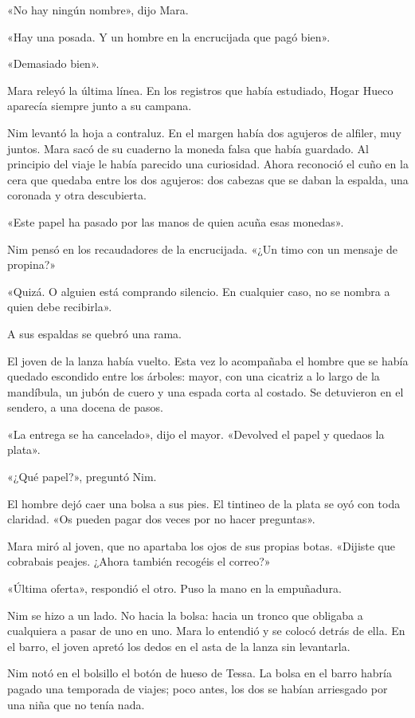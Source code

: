 \documentclass[10pt,a4paper]{article}
\begin{document}
«No hay ningún nombre», dijo Mara.

«Hay una posada. Y un hombre en la encrucijada que pagó bien».

«Demasiado bien».

Mara releyó la última línea. En los registros que había estudiado, Hogar Hueco aparecía siempre junto a su campana.

Nim levantó la hoja a contraluz. En el margen había dos agujeros de alfiler, muy juntos. Mara sacó de su cuaderno la moneda falsa que había guardado. Al principio del viaje le había parecido una curiosidad. Ahora reconoció el cuño en la cera que quedaba entre los dos agujeros: dos cabezas que se daban la espalda, una coronada y otra descubierta.

«Este papel ha pasado por las manos de quien acuña esas monedas».

Nim pensó en los recaudadores de la encrucijada. «¿Un timo con un mensaje de propina?»

«Quizá. O alguien está comprando silencio. En cualquier caso, no se nombra a quien debe recibirla».

A sus espaldas se quebró una rama.

El joven de la lanza había vuelto. Esta vez lo acompañaba el hombre que se había quedado escondido entre los árboles: mayor, con una cicatriz a lo largo de la mandíbula, un jubón de cuero y una espada corta al costado. Se detuvieron en el sendero, a una docena de pasos.

«La entrega se ha cancelado», dijo el mayor. «Devolved el papel y quedaos la plata».

«¿Qué papel?», preguntó Nim.

El hombre dejó caer una bolsa a sus pies. El tintineo de la plata se oyó con toda claridad. «Os pueden pagar dos veces por no hacer preguntas».

Mara miró al joven, que no apartaba los ojos de sus propias botas. «Dijiste que cobrabais peajes. ¿Ahora también recogéis el correo?»

«Última oferta», respondió el otro. Puso la mano en la empuñadura.

Nim se hizo a un lado. No hacia la bolsa: hacia un tronco que obligaba a cualquiera a pasar de uno en uno. Mara lo entendió y se colocó detrás de ella. En el barro, el joven apretó los dedos en el asta de la lanza sin levantarla.

Nim notó en el bolsillo el botón de hueso de Tessa. La bolsa en el barro habría pagado una temporada de viajes; poco antes, los dos se habían arriesgado por una niña que no tenía nada.
\end{document}

